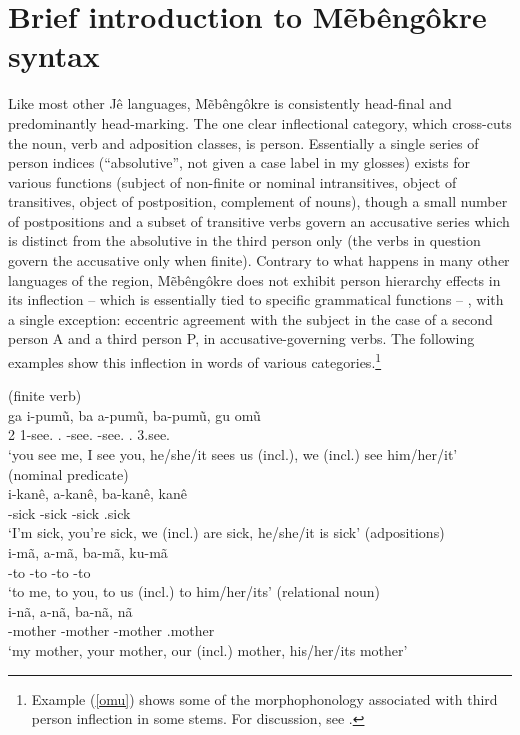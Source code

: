 \documentclass[output=paper]{langscibook}
\begin{document}
\section{Brief introduction to Mẽbêngôkre syntax}
\label{syntax}

Like most other Jê languages, Mẽbêngôkre is consistently head-final and predominantly head-marking. The one clear inflectional category, which cross-cuts the noun, verb and adposition classes, is person. Essentially a single series of person indices (``absolutive'', not given a case label in my glosses) exists for various functions (subject of non-finite or nominal intransitives, object of transitives, object of postposition, complement of nouns), though a small number of postpositions and a subset of transitive verbs govern an accusative series which is distinct from the absolutive in the third person only (the verbs in question govern the accusative only when finite). Contrary to what happens in many other languages of the region, Mẽbêngôkre does not exhibit person hierarchy effects in its inflection -- which is essentially tied to specific grammatical functions -- , with a single exception: eccentric agreement with the subject in the case of a second person A and a third person P, in accusative-governing verbs. The following examples show this inflection in words of various categories.\footnote{Example (\ref{omu}) shows some of the morphophonology associated with third person inflection in some stems. For discussion, see \citet{salanova:liames11}.}

\ea\label{inflection}
    \ea \label{omu} (finite verb) \\
    \gll ga i-pumũ, ba a-pumũ, ba-pumũ, gu omũ \\
        2\Nom{} 1-see.\Fin{} \First.\Nom{} \Second{}-see.\Fin{} \First\Incl{}-see.\Fin{} \First\Incl{}.\Nom{} 3.see.\Fin{}\\
      \glt `you see me, I see you, he/she/it sees us (incl.), we (incl.) see him/her/it'
    \ex (nominal predicate) \\
    \gll i-kanê, a-kanê, ba-kanê, kanê \\
        \First-sick \Second-sick \First\Incl{}-sick \Third.sick\\
      \glt `I'm sick, you're sick, we (incl.) are sick, he/she/it is sick'
    \ex (adpositions) \\
    \gll i-mã, a-mã, ba-mã, ku-mã \\
        \First-to \Second-to \First\Incl{}-to \Third\Acc-to\\
      \glt `to me, to you, to us (incl.) to him/her/its'
    \ex (relational noun) \\
    \gll i-nã, a-nã, ba-nã, nã \\
        \First-mother \Second-mother \First\Incl{}-mother \Third.mother\\
      \glt `my mother, your mother, our (incl.) mother, his/her/its mother'
    \z
\z
\end{document}
